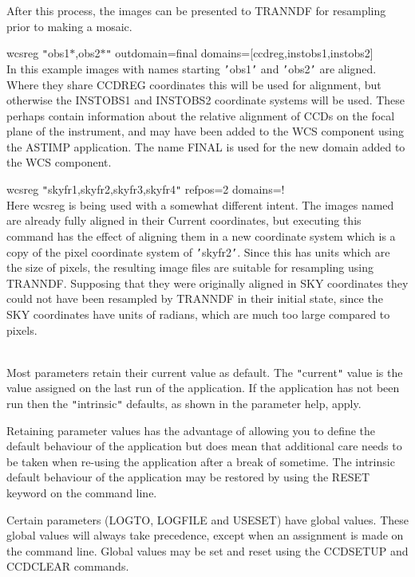 \documentclass[twoside,11pt]{article}
\newcommand{\htmlref}[2]{#1}
\renewcommand{\_}{\texttt{\symbol{95}}}
\newcommand{\qt}[1]{{\tt "}#1{\tt "}}
\newcommand{\routine}[1]{{\sc #1}}
\newcommand{\xroutine}[1]{\htmlref{{\sc #1}}{#1}}
\newcommand{\sstexamplesubsection}[2]{\sloppy \item{\ssttt #1} \mbox{} \\ #2 }
\newcommand{\sstdiytopic}[2]{\item[#1:] \mbox{} \\[1.3ex] #2}
\newcommand{\sstexamplesubsection}[2]{\item[{\ssttt #1}] #2}
\newcommand{\sstdiytopic}[2]{\item[{#1}] #2 }
\begin{document}
{{{         After this process, the images can be presented to TRANNDF for
         resampling prior to making a mosaic.
      }
      \sstexamplesubsection{
         wcsreg {\tt "}obs1\_$*$,obs2\_$*${\tt "} outdomain=final
             domains=[ccd\_reg,inst\_obs1,inst\_obs2]
      }{
         In this example images with names starting {\tt '}obs1\_{\tt '} and {\tt '}obs2\_{\tt '} are aligned.
         Where they share CCD\_REG coordinates this will be used for
         alignment, but otherwise the INST\_OBS1 and INST\_OBS2
         coordinate systems will be used.  These perhaps contain
         information about the relative alignment of CCDs on the focal
         plane of the instrument, and may have been added to the WCS
         component using the ASTIMP application.  The name FINAL is
         used for the new domain added to the WCS component.
      }
      \sstexamplesubsection{
         wcsreg {\tt "}skyfr1,skyfr2,skyfr3,skyfr4{\tt "} refpos=2 domains=!
      }{
         Here wcsreg is being used with a somewhat different intent.
         The images named are already fully aligned in their Current
         coordinates, but executing this command has the effect of
         aligning them in a new coordinate system which is a copy of
         the pixel coordinate system of {\tt '}skyfr2{\tt '}.  Since this has
         units which are the size of pixels, the resulting image files
         are suitable for resampling using \xroutine{TRANNDF}.  Supposing that
         they were originally aligned in SKY coordinates they could
         not have been resampled by \routine{TRANNDF} in their initial state,
         since the SKY coordinates have units of radians, which 
         are much too large compared to pixels.
      }
   }
   \sstdiytopic{
      Behaviour of parameters
   } {
      Most parameters retain their current value as default. The
      \qt{current} value is the value assigned on the last run of the
      application. If the application has not been run then the
      \qt{intrinsic} defaults, as shown in the parameter help, apply.

      Retaining parameter values has the advantage of allowing you to
      define the default behaviour of the application but does mean
      that additional care needs to be taken when re-using the
      application after a break of sometime. The intrinsic default
      behaviour of the application may be restored by using the RESET
      keyword on the command line.

      Certain parameters (LOGTO, LOGFILE and USESET) have global
      values. These global values will always take precedence, except
      when an assignment is made on the command line.  Global values may
      be set and reset using the \xroutine{CCDSETUP} and
      \xroutine{CCDCLEAR} commands.
   }
}
\end{document}
